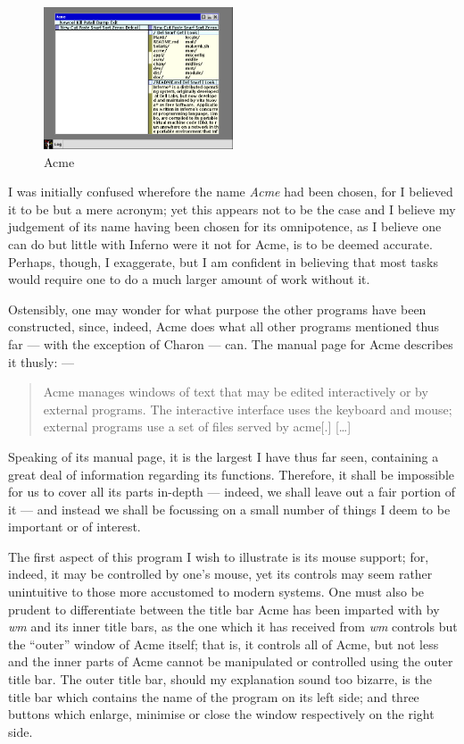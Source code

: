\documentclass[a5paper,twoside,12pt]{report}
\begin{document}
    \begin{figure}
      \centering
      \includegraphics[width=0.5\textwidth]{imgs/acme.png}
      \caption{Acme}
    \end{figure}

    I was initially confused wherefore the name \textit{Acme} had been chosen, for I believed it to be but a mere acronym; yet this appears not to be the case and I believe my judgement of its name having been chosen for its omnipotence, as I believe one can do but little with Inferno were it not for Acme, is to be deemed accurate. Perhaps, though, I exaggerate, but I am confident in believing that most tasks would require one to do a much larger amount of work without it.

    Ostensibly, one may wonder for what purpose the other programs have been constructed, since, indeed, Acme does what all other programs mentioned thus far — with the exception of Charon — can. The manual page for Acme describes it thusly: —

		\begin{quote}
        Acme manages windows of text that may be edited interactively or by external programs. The interactive interface uses the keyboard and mouse; external programs use a set of files served by acme[.] […]
	  \end{quote}

   Speaking of its manual page, it is the largest I have thus far seen, containing a great deal of information regarding its functions. Therefore, it shall be impossible for us to cover all its parts in-depth — indeed, we shall leave out a fair portion of it — and instead we shall be focussing on a small number of things I deem to be important or of interest.

   The first aspect of this program I wish to illustrate is its mouse support; for, indeed, it may be controlled by one's mouse, yet its controls may seem rather unintuitive to those more accustomed to modern systems. One must also be prudent to differentiate between the title bar Acme has been imparted with by \textit{wm} and its inner title bars, as the one which it has received from \textit{wm} controls but the ``outer'' window of Acme itself; that is, it controls all of Acme, but not less and the inner parts of Acme cannot be manipulated or controlled using the outer title bar. The outer title bar, should my explanation sound too bizarre, is the title bar which contains the name of the program on its left side; and three buttons which enlarge, minimise or close the window respectively on the right side.
\end{document}
